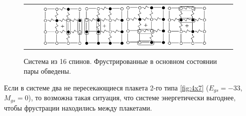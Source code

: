 \documentclass[utf8, babel, sor, jor, amsmath, amssymb, reprint]{elsarticle} %
\begin{document}
\begin{figure}[htbp]
	\centering
	\begin{tabular}{cc}
		\includegraphics[width=0.2\textwidth]{pictures/1_Cl1_Type_gs1.eps}  \hspace{0.03\textwidth}
		\includegraphics[width=0.2\textwidth]{pictures/1_Cl1_Type_gs2.eps} 
		\hspace{0.03\textwidth}
		\includegraphics[width=0.2\textwidth]{pictures/1_Cl1_Type_gs3.eps}  \hspace{0.03\textwidth}
		\includegraphics[width=0.2\textwidth]{pictures/1_Cl1_Type_gs4.eps} \\ 
	\end{tabular}
	\caption{Система из 16 спинов. Фрустрированные в основном состоянии пары обведены.}
	\label{fig:4x4.1}
\end{figure}

Если в системе два не пересекающиеся плакета 2-го типа \ref{fig:4x7} ($E_{gs}=-33$, $M_{gs}=0$), то возможна такая ситуация, что системе энергетически выгоднее, чтобы фрустрации находились между плакетами. 
\end{document}
